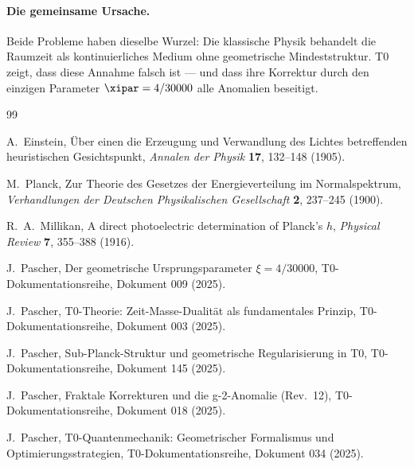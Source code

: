 \paragraph{Die gemeinsame Ursache.}
Beide Probleme haben dieselbe Wurzel: Die klassische Physik behandelt die Raumzeit 
als kontinuierliches Medium ohne geometrische Mindeststruktur. T0 zeigt, dass diese 
Annahme falsch ist — und dass ihre Korrektur durch den einzigen Parameter 
$\xipar = 4/30000$ alle Anomalien beseitigt.

\begin{thebibliography}{99}

A.~Einstein,
\newblock Über einen die Erzeugung und Verwandlung des Lichtes betreffenden
heuristischen Gesichtspunkt,
\newblock \emph{Annalen der Physik} \textbf{17}, 132–148 (1905).

M.~Planck,
\newblock Zur Theorie des Gesetzes der Energieverteilung im Normalspektrum,
\newblock \emph{Verhandlungen der Deutschen Physikalischen Gesellschaft} \textbf{2}, 
237–245 (1900).

R.~A.~Millikan,
\newblock A direct photoelectric determination of Planck's $h$,
\newblock \emph{Physical Review} \textbf{7}, 355–388 (1916).

J.~Pascher,
\newblock Der geometrische Ursprungsparameter $\xi = 4/30000$,
\newblock T0-Dokumentationsreihe, Dokument 009 (2025).

J.~Pascher,
\newblock T0-Theorie: Zeit-Masse-Dualität als fundamentales Prinzip,
\newblock T0-Dokumentationsreihe, Dokument 003 (2025).

J.~Pascher,
\newblock Sub-Planck-Struktur und geometrische Regularisierung in T0,
\newblock T0-Dokumentationsreihe, Dokument 145 (2025).

J.~Pascher,
\newblock Fraktale Korrekturen und die g-2-Anomalie (Rev.\ 12),
\newblock T0-Dokumentationsreihe, Dokument 018 (2025).

J.~Pascher,
\newblock T0-Quantenmechanik: Geometrischer Formalismus und Optimierungsstrategien,
\newblock T0-Dokumentationsreihe, Dokument 034 (2025).

\end{thebibliography}
